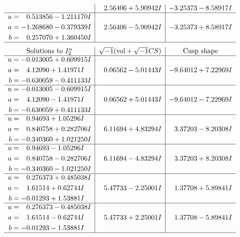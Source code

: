 \documentclass[1p]{elsarticle_modified}
\theoremstyle{definition}
\newcommand{\I}{\sqrt{-1}}
\begin{document}
$$\begin{array}{c|c|c}
 & \phantom{-}2.56406 + 5.90942 I & -3.25373 - 8.58917 I \\ \hline\begin{aligned}
u &= \phantom{-}0.513856 - 1.211170 I \\
a &= -1.268680 - 0.379339 I \\
b &= \phantom{-}0.257070 + 1.360450 I\end{aligned}
 & \phantom{-}2.56406 - 5.90942 I & -3.25373 + 8.58917 I\\
 \hline 
 \end{array}$$\newpage$$\begin{array}{c|c|c}  
\text{Solutions to }I^u_{2}& \I (\text{vol} + \sqrt{-1}CS) & \text{Cusp shape}\\
 \hline 
\begin{aligned}
u &= -0.013005 + 0.609915 I \\
a &= \phantom{-}4.12090 + 1.41971 I \\
b &= -0.630059 - 0.411133 I\end{aligned}
 & \phantom{-}0.06562 - 5.01443 I & -9.64012 + 7.22969 I \\ \hline\begin{aligned}
u &= -0.013005 - 0.609915 I \\
a &= \phantom{-}4.12090 - 1.41971 I \\
b &= -0.630059 + 0.411133 I\end{aligned}
 & \phantom{-}0.06562 + 5.01443 I & -9.64012 - 7.22969 I \\ \hline\begin{aligned}
u &= \phantom{-}0.94693 + 1.05296 I \\
a &= \phantom{-}0.840758 + 0.282706 I \\
b &= -0.340360 + 1.021250 I\end{aligned}
 & \phantom{-}6.11694 + 4.83294 I & \phantom{-}3.37203 - 8.20308 I \\ \hline\begin{aligned}
u &= \phantom{-}0.94693 - 1.05296 I \\
a &= \phantom{-}0.840758 - 0.282706 I \\
b &= -0.340360 - 1.021250 I\end{aligned}
 & \phantom{-}6.11694 - 4.83294 I & \phantom{-}3.37203 + 8.20308 I \\ \hline\begin{aligned}
u &= \phantom{-}0.276373 + 0.485038 I \\
a &= \phantom{-}1.61514 + 0.62744 I \\
b &= -0.01293 + 1.53881 I\end{aligned}
 & \phantom{-}5.47733 - 2.25001 I & \phantom{-}1.37708 + 5.89841 I \\ \hline\begin{aligned}
u &= \phantom{-}0.276373 - 0.485038 I \\
a &= \phantom{-}1.61514 - 0.62744 I \\
b &= -0.01293 - 1.53881 I\end{aligned}
 & \phantom{-}5.47733 + 2.25001 I & \phantom{-}1.37708 - 5.89841 I\\
 \hline 
 \end{array}$$\newpage
\end{document}
